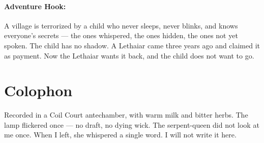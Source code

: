 \paragraph{Adventure Hook:}
A village is terrorized by a child who never sleeps, never blinks, and knows everyone's secrets — the ones whispered, the ones hidden, the ones not yet spoken. The child has no shadow. A Lethaiar came three years ago and claimed it as payment. Now the Lethaiar wants it back, and the child does not want to go.

\section*{Colophon}
Recorded in a Coil Court antechamber, with warm milk and bitter herbs. The lamp flickered once — no draft, no dying wick. The serpent-queen did not look at me once. When I left, she whispered a single word. I will not write it here.